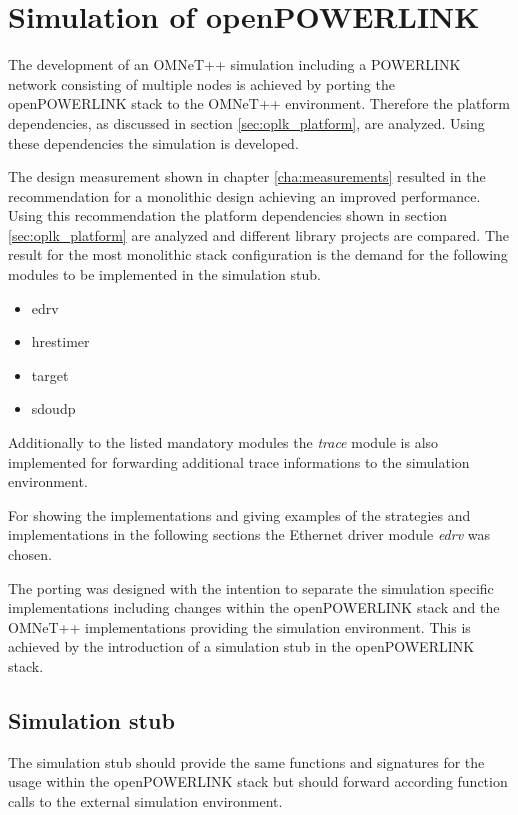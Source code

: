 \chapter{Simulation of openPOWERLINK}
\label{cha:porting}
The development of an OMNeT++ simulation including a POWERLINK network consisting of multiple nodes is achieved by porting the openPOWERLINK stack to the OMNeT++ environment.
Therefore the platform dependencies, as discussed in section \ref{sec:oplk_platform}, are analyzed.
Using these dependencies the simulation is developed.

The design measurement shown in chapter \ref{cha:measurements} resulted in the recommendation for a monolithic design achieving an improved performance.
Using this recommendation the platform dependencies shown in section \ref{sec:oplk_platform} are analyzed and different library projects are compared.
The result for the most monolithic stack configuration is the demand for the following modules to be implemented in the simulation stub.

\begin{itemize}
    \item edrv
    \item hrestimer
    \item target
    \item sdoudp
\end{itemize}

Additionally to the listed mandatory modules the \emph{trace} module is also implemented for forwarding additional trace informations to the simulation environment.

For showing the implementations and giving examples of the strategies and implementations in the following sections the Ethernet driver module \emph{edrv} was chosen.

The porting was designed with the intention to separate the simulation specific implementations including changes within the openPOWERLINK stack and the OMNeT++ implementations providing the simulation environment.
This is achieved by the introduction of a simulation stub in the openPOWERLINK stack.

\section{Simulation stub}
\label{sec:porting_simstub}

The simulation stub should provide the same functions and signatures for the usage within the openPOWERLINK stack but should forward according function calls to the external simulation environment.

